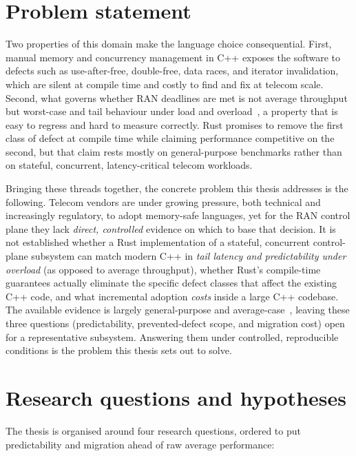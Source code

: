 \documentclass[english,twoside,openright,a4paper,censored,csm,software-track-2020]{HYthesisML}
\begin{document}
\section{Problem statement}
Two properties of this domain make the language choice consequential. First, manual memory and
concurrency management in C++ exposes the software to defects such as use-after-free,
double-free, data races, and iterator invalidation, which are silent at compile time and costly
to find and fix at telecom scale. Second, what governs whether RAN deadlines are met is not
average throughput but worst-case and tail behaviour under load and
overload~\cite{dean2013tail}, a property that is easy to regress and hard to measure correctly.
Rust promises to remove the first class of defect at compile time while claiming performance
competitive on the second, but that claim rests mostly on general-purpose benchmarks rather
than on stateful, concurrent, latency-critical telecom workloads.

Bringing these threads together, the concrete problem this thesis addresses is the following.
Telecom vendors are under growing pressure, both technical and increasingly regulatory, to adopt
memory-safe languages, yet for the RAN control plane they lack \emph{direct, controlled}
evidence on which to base that decision. It is not established whether a Rust implementation of
a stateful, concurrent control-plane subsystem can match modern C++ in \emph{tail latency and
predictability under overload} (as opposed to average throughput), whether Rust's compile-time
guarantees actually eliminate the specific defect classes that affect the existing C++ code,
and what incremental adoption \emph{costs} inside a large C++ codebase. The available evidence
is largely general-purpose and average-case~\cite{balasubramanian2017rust,qin2020rust}, leaving
these three questions (predictability, prevented-defect scope, and migration cost) open for a
representative subsystem. Answering them under controlled, reproducible conditions is the
problem this thesis sets out to solve.

\section{Research questions and hypotheses}\label{sec:rqs}
The thesis is organised around four research questions, ordered to put predictability and
migration ahead of raw average performance:
\end{document}
